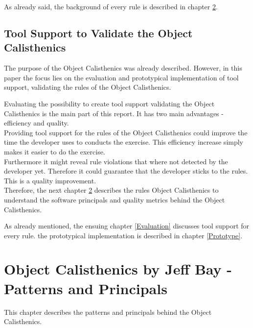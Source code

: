 As already said, the background of every rule is described in chapter \ref{Description}.

\section{Tool Support to Validate the Object Calisthenics}



The purpose of the Object Calisthenics was already described. However, in this paper the focus lies on the evaluation and prototypical implementation of tool support, validating the rules of the Object Calisthenics. 

Evaluating the possibility to create tool support validating the Object Calisthenics is the main part of this report. It has two main advantages - efficiency and quality.\\

Providing tool support for the rules of the Object Calisthenics could improve the time the developer uses to conducts the exercise. This efficiency increase simply makes it easier to do the exercise.\\

Furthermore it might reveal rule violations that where not detected by the developer yet. Therefore it could guarantee that the developer sticks to the rules. This is a quality improvement. \\

Therefore, the next chapter  \ref{Description} describes the rules Object Calisthenics to understand the software principals and quality metrics behind the Object Calisthenics. 

As already mentioned, the ensuing chapter \ref{Evaluation} discusses tool support for every rule.  the prototypical implementation is described in chapter \ref{Prototype}.

\chapter{Object Calisthenics by Jeff Bay - Patterns and Principals}
\label{Description}
This chapter describes the patterns and principals behind the Object Calisthenics. 

